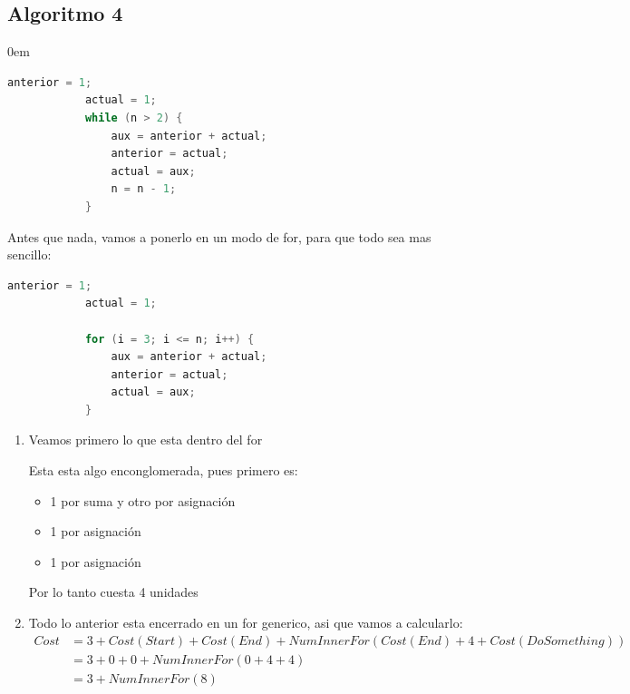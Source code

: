 \documentclass[12pt, fleqn]{article}                            %
\newenvironment{SmallIndentation}[1][0.75em]                    %
        {\begin{adjustwidth}{#1}{}\begin{footnotesize}}             %
        {\end{footnotesize}\end{adjustwidth}}                       %
\theoremstyle{break}                                            %
\begin{document}
    \clearpage
    \subsection{Algoritmo 4}
    \begin{SmallIndentation}[0em]
            
        \begin{lstlisting}[language=C, gobble=12, basicstyle=\small\color{white}]
            anterior = 1;                   
            actual = 1;                     
            while (n > 2) {
                aux = anterior + actual;    
                anterior = actual;          
                actual = aux;               
                n = n - 1;
            }
        \end{lstlisting}   

        Antes que nada, vamos a ponerlo en un modo de for, para que todo sea mas sencillo:
        \begin{lstlisting}[language=C, gobble=12, basicstyle=\small\color{white}]
            anterior = 1;                   
            actual = 1;  

            for (i = 3; i <= n; i++) {                  
                aux = anterior + actual;    
                anterior = actual;          
                actual = aux;               
            }
        \end{lstlisting} 

        \begin{enumerate}
            \item
                Veamos primero lo que esta dentro del for

                Esta esta algo enconglomerada, pues primero es:
                \begin{itemize}
                    \item 1 por suma y otro por asignación
                    \item 1 por asignación
                    \item 1 por asignación
                \end{itemize}

                Por lo tanto cuesta 4 unidades


            \item Todo lo anterior esta encerrado en un for generico, 
                asi que vamos a calcularlo:
                \begin{align*}
                    Cost 
                        &= 3 + Cost(Start) + Cost(End) + NumInnerFor(Cost(End) + 4 + Cost(DoSomething))     \\
                        &= 3 + 0 + 0 + NumInnerFor(0+ 4 + 4)                \\
                        &= 3 + NumInnerFor(8)                
                \end{align*}


\end{enumerate}
\end{SmallIndentation}
\end{document}
